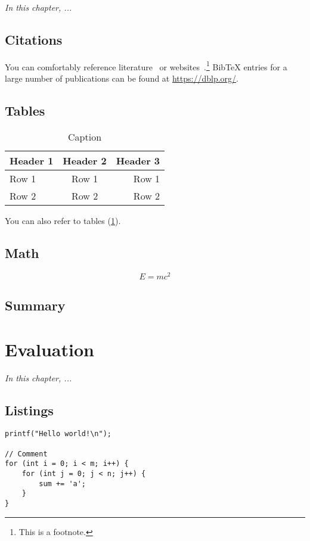 \documentclass[
	12pt,
	a4paper,
	abstract,
	bibliography=totoc,
	chapterprefix,
	headings=openright,
	numbers=endperiod,
	parskip=half,
	twoside,
]{scrreprt}
\begin{document}
\textit{In this chapter, ...}

\section{Citations}

You can comfortably reference literature~\cite{DBLP:journals/superfri/DuweLMSF0B020} or websites~\cite{WWW:ParCIO-Blog}.\footnote{This is a footnote.}
BibTeX entries for a large number of publications can be found at \url{https://dblp.org/}.

\section{Tables}

\begin{table}[ht]
	\centering
	\begin{tabular}{|l|c|r|}
		\hline
		\textbf{Header 1} & \textbf{Header 2} & \textbf{Header 3} \\
		\hline
		\hline
		Row 1 & Row 1 & Row 1 \\
		Row 2 & Row 2 & Row 2 \\
		\hline
	\end{tabular}
	\caption{Caption}
	\label{tab:table}
\end{table}

You can also refer to tables (\cref{tab:table}).

\section{Math}

\[
	E = m c^2
\]

\section*{Summary}

\lipsum[2]

\chapter{Evaluation}
\label{cha:evaluation}

\textit{In this chapter, ...}

\section{Listings}

\begin{lstlisting}[caption=Caption,label=lst:hello-world]
printf("Hello world!\n");

// Comment
for (int i = 0; i < m; i++) {
	for (int j = 0; j < n; j++) {
		sum += 'a';
	}
}
\end{lstlisting}
\end{document}

